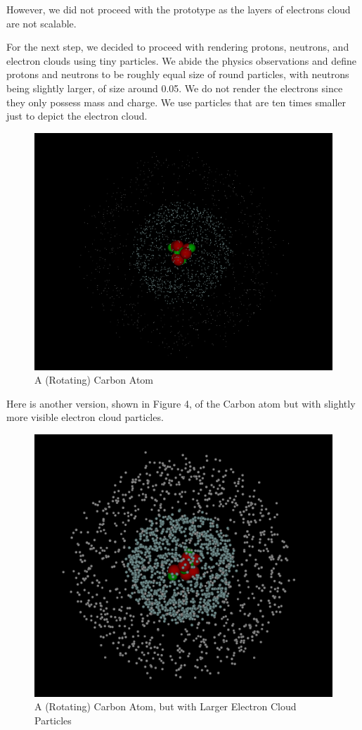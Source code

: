 \documentclass[acmtog]{acmart}
\begin{document}
However, we did not proceed with the prototype as the layers of electrons cloud are not scalable.

For the next step, we decided to proceed with rendering protons, neutrons, and electron clouds using tiny particles. We abide the physics observations and define protons and neutrons to be roughly equal size of round particles, with neutrons being slightly larger, of size around 0.05. We do not render the electrons since they only possess mass and charge. We use particles that are ten times smaller just to depict the electron cloud.

\begin{figure}[h]
  \centering
  \includegraphics[width=\linewidth]{./carbon.png}
  \caption{A (Rotating) Carbon Atom}
\end{figure}

Here is another version, shown in Figure 4, of the Carbon atom but with slightly more visible electron cloud particles.

\begin{figure}[h]
  \centering
  \includegraphics[width=\linewidth]{./carbon_2.png}
  \caption{A (Rotating) Carbon Atom, but with Larger Electron Cloud Particles}
\end{figure}
\end{document}

